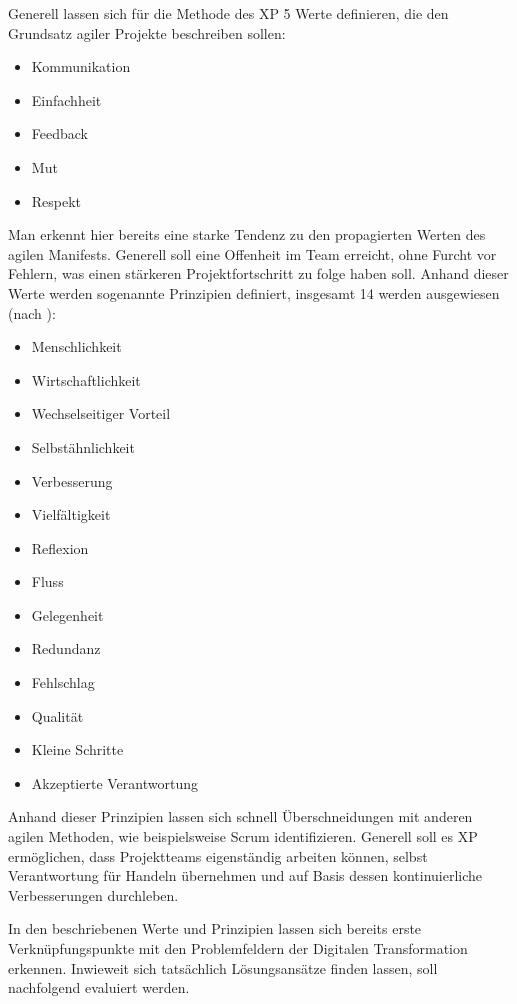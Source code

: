 Generell lassen sich für die Methode des XP 5 Werte definieren, die den Grundsatz agiler Projekte beschreiben sollen:

\begin{itemize}[noitemsep, topsep=0pt]
	\item Kommunikation
	\item Einfachheit
	\item Feedback
	\item Mut
	\item Respekt
\end{itemize}

Man erkennt hier bereits eine starke Tendenz zu den propagierten Werten des agilen Manifests. Generell soll eine Offenheit im Team erreicht, ohne Furcht vor Fehlern, was einen stärkeren Projektfortschritt zu folge haben soll. Anhand dieser Werte werden sogenannte Prinzipien definiert, insgesamt 14 werden ausgewiesen (nach ):

\begin{itemize}[noitemsep, topsep=0pt]
	\item Menschlichkeit
	\item Wirtschaftlichkeit
	\item Wechselseitiger Vorteil
	\item Selbstähnlichkeit
	\item Verbesserung
	\item Vielfältigkeit
	\item Reflexion
	\item Fluss
	\item Gelegenheit
	\item Redundanz
	\item Fehlschlag
	\item Qualität
	\item Kleine Schritte
	\item Akzeptierte Verantwortung
\end{itemize}

Anhand dieser Prinzipien lassen sich schnell Überschneidungen mit anderen agilen Methoden, wie beispielsweise Scrum identifizieren. Generell soll es XP ermöglichen, dass Projektteams eigenständig arbeiten können, selbst Verantwortung für Handeln übernehmen und auf Basis dessen kontinuierliche Verbesserungen durchleben.

In den beschriebenen Werte und Prinzipien lassen sich bereits erste Verknüpfungspunkte mit den Problemfeldern der Digitalen Transformation erkennen. Inwieweit sich tatsächlich Lösungsansätze finden lassen, soll nachfolgend evaluiert werden.

